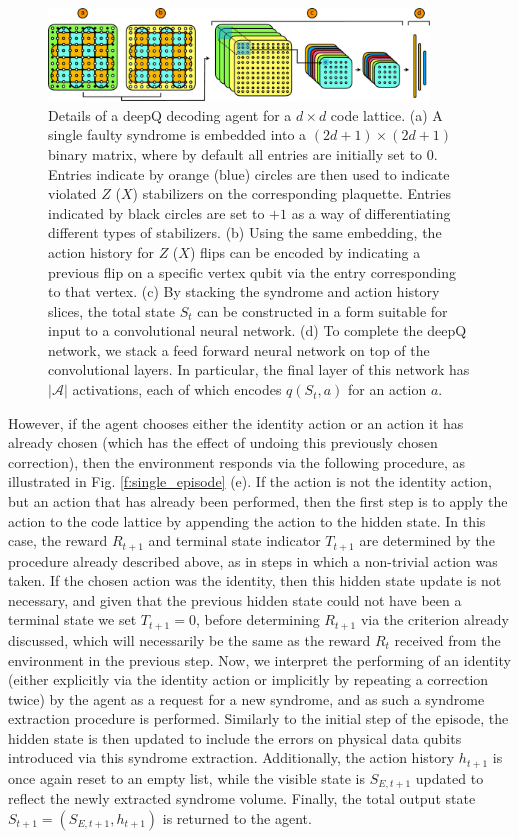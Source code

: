 \documentclass[twocolumn,preprintnumbers,amsmath,amssymb,notitlepage,nofootinbib,longbibliography,superscriptaddress,aps,pra,10pt]{revtex4-1}
\begin{document}
    \begin{figure}
      \centering
          \includegraphics[width=0.9\textwidth]{figures/agent.pdf}
      \caption{Details of a deepQ decoding agent for a $d\times d$ code lattice. (a) A single faulty syndrome is embedded into a $(2d +1)\times(2d+1)$ binary matrix, where by default all entries are initially set to $0$. Entries indicate by orange (blue) circles are then used to indicate violated $Z$ ($X$) stabilizers on the corresponding plaquette. Entries indicated by black circles are set to $+1$ as a way of differentiating different types of stabilizers. (b) Using the same embedding, the action history for $Z$ ($X$) flips can be encoded by indicating a previous flip on a specific vertex qubit via the entry corresponding to that vertex. (c) By stacking the syndrome and action history slices, the total state $S_t$ can be constructed in a form suitable for input to a convolutional neural network. (d) To complete the deepQ network, we stack a feed forward neural network on top of the convolutional layers. In particular, the final layer of this network has $|\mathcal{A}|$ activations, each of which encodes $q(S_t,a)$ for an action $a$.}\label{f:agent}
    \end{figure}

    However, if the agent chooses either the identity action or an action it has already chosen (which has the effect of undoing this previously chosen correction), then the environment responds via the following procedure, as illustrated in Fig. \ref{f:single_episode} (e).
    If the action is not the identity action, but an action that has already been performed, then the first step is to apply the action to the code lattice by appending the action to the hidden state. 
    In this case, the reward $R_{t+1}$ and terminal state indicator $T_{t+1}$ are determined by the procedure already described above, as in steps in which a non-trivial action was taken.
    If the chosen action was the identity, then this hidden state update is not necessary, and given that the previous hidden state could not have been a terminal state we set $T_{t+1} = 0$, before determining $R_{t+1}$ via the criterion already discussed, which will necessarily be the same as the reward $R_t$ received from the environment in the previous step. 
    Now, we interpret the performing of an identity (either explicitly via the identity action or implicitly by repeating a correction twice) by the agent as a request for a new syndrome, and as such a syndrome extraction procedure is performed.
    Similarly to the initial step of the episode, the hidden state is then updated to include the errors on physical data qubits introduced via this syndrome extraction.
    Additionally, the action history $h_{t+1}$ is once again reset to an empty list, while the visible state is $S_{E,t+1}$ updated to reflect the newly extracted syndrome volume.
    Finally, the total output state $S_{t+1} = (S_{E,t+1},h_{t+1})$ is returned to the agent.
\end{document}
